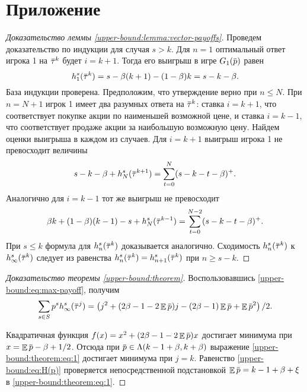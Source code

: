 \documentclass[12pt, draft]{extarticle}
\newcommand{\overbar}[1]%
{\mkern 1.5mu\overline{\mkern-1.3mu#1\mkern-1.3mu}\mkern 1.3mu}
\newcommand{\p}{\ensuremath{\overbar{p}}}
\DeclareMathOperator{\E}{\mathbb{E}}
\newcommand{\G}[1][n]{\ensuremath{G_{#1}}}
\newcommand{\tauv}{\ensuremath{\overbar{\tau}}}
\begin{document}
\appendix
\setcounter{secnumdepth}{0}
\section{Приложение}

\begin{proof}[Доказательство леммы \ref{upper-bound:lemma:vector-payoffs}]
  Проведем доказательство по индукции для случая $s > k$. Для $n = 1$
  оптимальный ответ игрока 1 на $\tauv^k$ будет $i = k + 1$. Тогда его выигрыш в
  игре $\G[1](\p)$ равен
  \begin{equation*}
    h^s_1(\tauv^k) = s - \beta(k+1) - (1-\beta)k = s - k - \beta.
  \end{equation*}
  База индукции проверена. Предположим, что утверждение верно при $n \leqslant
  N$. При $n = N + 1$ игрок 1 имеет два разумных ответа на $\tauv^k$: ставка $i
  = k + 1$, что соответствует покупке акции по наименьшей возможной цене, и
  ставка $i = k - 1$, что соответствует продаже акции за наибольшую возможную
  цену. Найдем оценки выигрыша в каждом из случаев. Для $i = k + 1$ выигрыш
  игрока 1 не превосходит величины
  \begin{equation*}
    s - k - \beta + h^s_N(\tauv^{k+1}) = \sum_{t=0}^N(s-k-t-\beta)^+.
  \end{equation*}
  Аналогично для $i = k - 1$ тот же выигрыш не превосходит
  \begin{equation*}
    \beta k + (1-\beta)(k-1) - s + h^s_N(\tauv^{k-1}) = \sum_{t=0}^{N-2}(s-k-t-\beta)^+.
  \end{equation*}
  При $s \leqslant k$ формула для $h^s_n(\tauv^k)$ доказывается аналогично.
  Сходимость $h^s_n(\tauv^k)$ к $h^s_\infty(\tauv^k)$ следует из равенства
  $h^s_n(\tauv^k) = h^s_{n+1}(\tauv^k)$ при $n \geqslant s - k$.
\end{proof}

\begin{proof}[Доказательство теоремы \ref{upper-bound:theorem}]
  Воспользовавшись \eqref{upper-bound:eq:max-payoff}, получим
  \begin{equation}
    \label{upper-bound:theorem:eq:1}
    \sum_{s \in S} p^s h^s_\infty(\tauv^j) =
    \left(
      j^2 + (2\beta - 1 - 2 \E \p)j - (2\beta - 1) \E \p + \E \p^2
    \right)/2.
  \end{equation}
  
  Квадратичная функция $f(x) = x^2 + (2\beta - 1 - 2\E \p)x$ достигает минимума
  при $x = \E \p - \beta + 1/2$. Отсюда при $\p \in \Lambda(k - 1 + \beta, k +
  \beta)$ выражение \eqref{upper-bound:theorem:eq:1} достигает минимума при $j =
  k$. Равенство \eqref{upper-bound:eq:H(p)} проверяется непосредственной
  подстановкой $\E \p = k - 1 + \beta + \xi$ в \eqref{upper-bound:theorem:eq:1}.
\end{proof}
\end{document}

